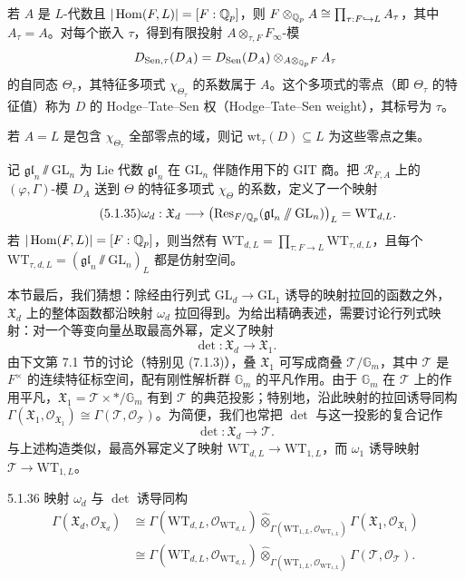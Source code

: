 若 $A$ 是 $L$-代数且 $|\operatorname{Hom}(F,L)|=[F:\mathbb{Q}_p]$，则 $F\otimes_{\mathbb{Q}_p}A\cong\prod_{\tau:F\hookrightarrow L}A_\tau$，其中 $A_\tau=A$。对每个嵌入 $\tau$，得到有限投射 $A\otimes_{\tau,F}F_\infty$-模
\[
D_{\mathrm{Sen},\tau}(D_A)=D_{\mathrm{Sen}}(D_A)\otimes_{A\otimes_{\mathbb{Q}_p}F}A_\tau
\]
的自同态 $\Theta_\tau$，其特征多项式 $\chi_{\Theta_\tau}$ 的系数属于 $A$。这个多项式的零点（即 $\Theta_\tau$ 的特征值）称为 $D$ 的 Hodge--Tate--Sen 权（Hodge--Tate--Sen weight），其标号为 $\tau$。

若 $A=L$ 是包含 $\chi_{\Theta_\tau}$ 全部零点的域，则记 $\mathrm{wt}_\tau(D)\subseteq L$ 为这些零点之集。

记 $\mathfrak{gl}_n\sslash\mathrm{GL}_n$ 为 Lie 代数 $\mathfrak{gl}_n$ 在 $\mathrm{GL}_n$ 伴随作用下的 GIT 商。把 $\mathcal{R}_{F,A}$ 上的 $(\varphi,\Gamma)$-模 $D_A$ 送到 $\Theta$ 的特征多项式 $\chi_\Theta$ 的系数，定义了一个映射
\begin{equation}\tag{5.1.35}
\omega_d: \mathfrak{X}_d\longrightarrow\bigl(\mathrm{Res}_{F/\mathbb{Q}_p}(\mathfrak{gl}_n\sslash\mathrm{GL}_n)\bigr)_L=\mathrm{WT}_{d,L}.
\end{equation}
若 $|\operatorname{Hom}(F,L)|=[F:\mathbb{Q}_p]$，则当然有 $\mathrm{WT}_{d,L}=\prod_{\tau:F\to L}\mathrm{WT}_{\tau,d,L}$，且每个 $\mathrm{WT}_{\tau,d,L}=(\mathfrak{gl}_n\sslash\mathrm{GL}_n)_L$ 都是仿射空间。

本节最后，我们猜想：除经由行列式 $\mathrm{GL}_d\to\mathrm{GL}_1$ 诱导的映射拉回的函数之外，$\mathfrak{X}_d$ 上的整体函数都沿映射 $\omega_d$ 拉回得到。为给出精确表述，需要讨论行列式映射：对一个等变向量丛取最高外幂，定义了映射
\[
\det: \mathfrak{X}_d\longrightarrow\mathfrak{X}_1.
\]
由下文第 7.1 节的讨论（特别见 (7.1.3)），叠 $\mathfrak{X}_1$ 可写成商叠 $\mathcal{T}/\mathbb{G}_m$，其中 $\mathcal{T}$ 是 $F^\times$ 的连续特征标空间，配有刚性解析群 $\mathbb{G}_m$ 的平凡作用。由于 $\mathbb{G}_m$ 在 $\mathcal{T}$ 上的作用平凡，$\mathfrak{X}_1=\mathcal{T}\times */\mathbb{G}_m$ 有到 $\mathcal{T}$ 的典范投影；特别地，沿此映射的拉回诱导同构 $\Gamma(\mathfrak{X}_1,\mathcal{O}_{\mathfrak{X}_1})\cong\Gamma(\mathcal{T},\mathcal{O}_{\mathcal{T}})$。为简便，我们也常把 $\det$ 与这一投影的复合记作
\[
\det:\mathfrak{X}_d\longrightarrow\mathcal{T}.
\]
与上述构造类似，最高外幂定义了映射 $\mathrm{WT}_{d,L}\to\mathrm{WT}_{1,L}$，而 $\omega_1$ 诱导映射 $\mathcal{T}\to\mathrm{WT}_{1,L}$。

\begin{conj}{5.1.36}
映射 $\omega_d$ 与 $\det$ 诱导同构
{\small
\[
\begin{aligned}
\Gamma(\mathfrak{X}_d,\mathcal{O}_{\mathfrak{X}_d})
&\cong\Gamma(\mathrm{WT}_{d,L},\mathcal{O}_{\mathrm{WT}_{d,L}})\widehat{\otimes}_{\Gamma(\mathrm{WT}_{1,L},\mathcal{O}_{\mathrm{WT}_{1,L}})}\Gamma(\mathfrak{X}_1,\mathcal{O}_{\mathfrak{X}_1})\\
&\cong\Gamma(\mathrm{WT}_{d,L},\mathcal{O}_{\mathrm{WT}_{d,L}})\widehat{\otimes}_{\Gamma(\mathrm{WT}_{1,L},\mathcal{O}_{\mathrm{WT}_{1,L}})}\Gamma(\mathcal{T},\mathcal{O}_{\mathcal{T}}).
\end{aligned}
\]}
\label{thm:a4-5-1-36}
\end{conj}

